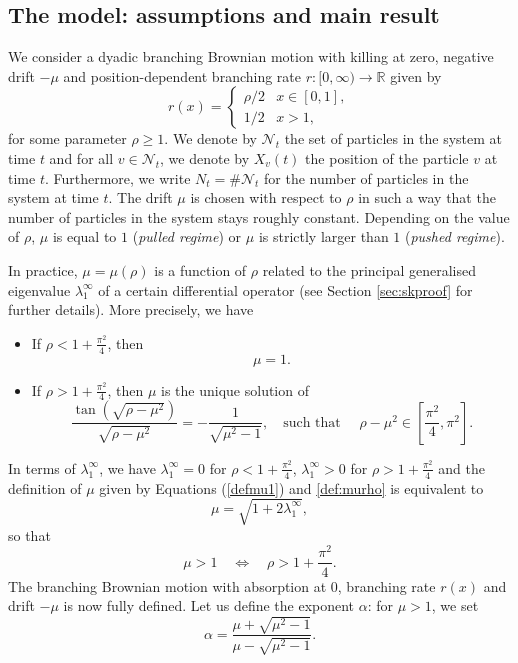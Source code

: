 \documentclass[11pt]{article}
\theoremstyle{plain}
\newcommand\linf{\lambda_1^\infty}
\begin{document}
\subsection{The model: assumptions and main result} \label{sec:model}

We consider a dyadic branching Brownian motion with killing at zero, negative drift $-\mu$ and position-dependent branching rate $r:[0,\infty)\to\mathbb{R}$ given by
\[
r(x) = \begin{cases}
\rho/2 & x\in[0,1],\\
1/2 & x>1,
\end{cases}
\]
for some parameter $\rho\geqslant1$. We denote by $\mathcal N_t$ the set of particles in the system at time $t$ and for all $v\in\mathcal N_t$, we denote by $X_v(t)$ the position of the particle $v$ at time $t$. Furthermore, we write $N_t = \#\mathcal N_t$ for the number of particles in the system at time $t$. The drift $\mu$ is chosen with respect to $\rho$ in such a way that the number of particles in the system  stays roughly constant. Depending on the value of $\rho$, $\mu$ is equal to $1$ (\textit{pulled regime}) or $\mu$ is strictly larger than $1$ (\textit{pushed regime}). 

In practice, $\mu=\mu(\rho)$ is a function of $\rho$ related to the principal generalised eigenvalue $\linf$ of a certain differential operator (see Section \ref{sec:skproof} for further details). More precisely, we have

\begin{itemize}
\item If $\rho<1+\frac{\pi^2}{4}$, then 
\begin{equation}
\mu=1. \label{defmu1}
\end{equation}
\item If $\rho>1+\frac{\pi^2}{4}$, then  $\mu$ is the unique solution of 
\begin{equation}
\frac{\tan(\sqrt{\rho-\mu^2})}{\sqrt{\rho-\mu^2}}=-\frac{1}{\sqrt{\mu^2-1}}, \quad \text{such that } \quad \rho-\mu^2\in\left[\frac{\pi^2}{4},\pi^2\right].\label{def:murho}
\end{equation}
\end{itemize}
In terms of $\linf$, we have $\linf=0$ for $\rho<1+\frac{\pi^2}{4}$, $\linf>0$ for $\rho>1+\frac{\pi^2}{4}$ and the definition of $\mu$ given by Equations (\ref{defmu1}) and \eqref{def:murho} is equivalent to
\begin{equation}
\label{def:mu} \mu=\sqrt{1+2\linf},
\end{equation}
so that 
\begin{equation*}
\mu>1 \quad \iff \quad \rho>1+\frac{\pi^2}{4}.
\end{equation*}
The branching Brownian motion with absorption at $0$, branching rate $r(x)$ and drift $-\mu$ is now fully defined. Let us define the exponent $\alpha$: for $\mu>1$, we set 
\begin{equation}
\alpha=\frac{\mu+\sqrt{\mu^2-1}}{\mu-\sqrt{\mu^2-1}}.\label{defalpha:rho}
\end{equation}
\end{document}
